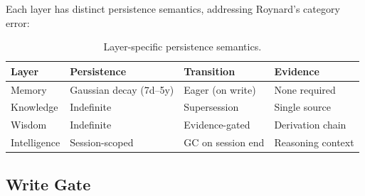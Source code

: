 \documentclass[11pt,letterpaper]{article}
\begin{document}
Each layer has distinct persistence semantics, addressing Roynard's category error:

\begin{table}[H]
\centering
\caption{Layer-specific persistence semantics.}
\label{tab:persistence}
\begin{tabular}{@{}llll@{}}
\toprule
\textbf{Layer} & \textbf{Persistence} & \textbf{Transition} & \textbf{Evidence} \\
\midrule
Memory & Gaussian decay (7d--5y) & Eager (on write) & None required \\
Knowledge & Indefinite & Supersession & Single source \\
Wisdom & Indefinite & Evidence-gated & Derivation chain \\
Intelligence & Session-scoped & GC on session end & Reasoning context \\
\bottomrule
\end{tabular}
\end{table}

\subsection{Write Gate}
\end{document}
